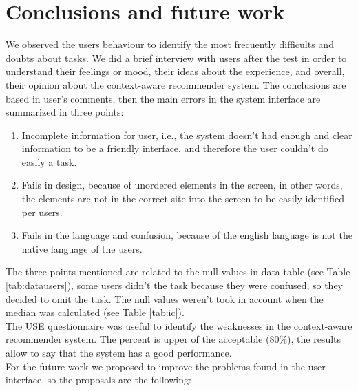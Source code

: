 \chapter{Conclusions and future work} \label{conclusions}

We observed the users behaviour to identify the most frecuently difficults and
doubts about tasks. We did a brief interview with users after the test in order
to understand their  feelings or mood, their ideas about the experience, and
overall, their opinion about the context-aware recommender system.  The
conclusions are based in user's comments, then the main errors in the system
interface are summarized in three points:
\begin{enumerate}  
\item  Incomplete information for user, i.e., the system doesn't had enough and clear information to be a friendly interface, and therefore the user couldn't do easily a task.
\item Fails in design, because of unordered elements in the screen, in other words, the elements are not in the correct site into the screen to be easily identified per users.
\item Fails in the language and confusion, because of the english language is not the native language of the users.
\end{enumerate}

The three points mentioned are related to the null values in data table (see
Table \ref{tab:datausers}), some users didn't the task because they were
confused, so they decided to omit the task. The null values weren't took in
account when the median was calculated (see Table \ref{tab:ic}).\\  The USE
questionnaire was useful to identify the weaknesses in the context-aware
recommender system.  The percent is upper of the acceptable (80\%), the results
allow to say that the system has a good performance. \\ For the future work we
proposed to improve the problems found in the user interface, so the proposals
are the following:

